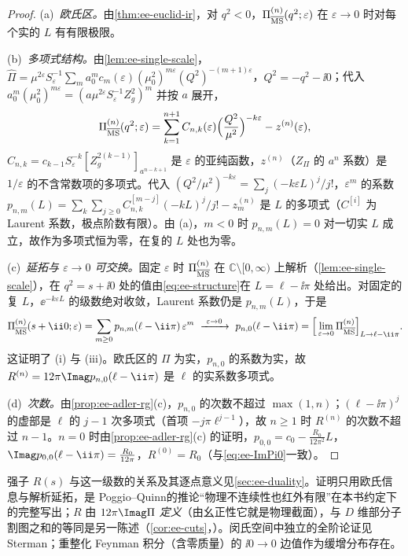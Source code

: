 \begin{proof}
(a)~\emph{欧氏区。}由\cref{thm:ee-euclid-ir}，对 $q^2<0$，$\Pi^{(n)}_{\overline{\rm MS}}(q^2;\varepsilon)$ 在 $\varepsilon\to0$ 时对每个实的 $L$ 有有限极限。

(b)~\emph{多项式结构。}由\cref{lem:ee-single-scale}，$\hat\Pi=\mu^{2\varepsilon}S_\varepsilon^{-1}\sum_ma_0^mc_m(\varepsilon)(\mu_0^2)^{m\varepsilon}(Q^2)^{-(m+1)\varepsilon}$，$Q^2=-q^2-\ii0$；代入 $a_0^m(\mu_0^2)^{m\varepsilon}=(a\mu^{2\varepsilon}S_\varepsilon^{-1}Z_g^2)^m$ 并按 $a$ 展开，
\begin{equation}\label{eq:ee-structure}
\Pi^{(n)}_{\overline{\rm MS}}(q^2;\varepsilon)=\sum_{k=1}^{n+1}C_{n,k}(\varepsilon)\Big(\frac{Q^2}{\mu^2}\Big)^{-k\varepsilon}-z^{(n)}(\varepsilon),
\end{equation}
$C_{n,k}=c_{k-1}S_\varepsilon^{-k}[Z_g^{2(k-1)}]_{a^{n-k+1}}$ 是 $\varepsilon$ 的亚纯函数，$z^{(n)}$（$Z_\Pi$ 的 $a^n$ 系数）是 $1/\varepsilon$ 的不含常数项的多项式。代入 $(Q^2/\mu^2)^{-k\varepsilon}=\sum_j(-k\varepsilon L)^j/j!$，$\varepsilon^m$ 的系数
$p_{n,m}(L)=\sum_k\sum_{j\ge0}C_{n,k}^{[m-j]}(-kL)^j/j!-z^{(n)}_m$
是 $L$ 的多项式（$C^{[i]}$ 为 Laurent 系数，极点阶数有限）。由 (a)，$m<0$ 时 $p_{n,m}(L)=0$ 对一切实 $L$ 成立，故作为多项式恒为零，在复的 $L$ 处也为零。

(c)~\emph{延拓与 $\varepsilon\to0$ 可交换。}固定 $\varepsilon$ 时 $\Pi^{(n)}_{\overline{\rm MS}}$ 在 $\mathbb C\setminus[0,\infty)$ 上解析（\cref{lem:ee-single-scale}），在 $q^2=s+\ii0$ 处的值由\cref{eq:ee-structure}在 $L=\ell-\ii\pi$ 处给出。对固定的复 $L$，$\ee^{-k\varepsilon L}$ 的级数绝对收敛，Laurent 系数仍是 $p_{n,m}(L)$，于是
\[
\Pi^{(n)}_{\overline{\rm MS}}(s+\ii0;\varepsilon)=\sum_{m\ge0}p_{n,m}(\ell-\ii\pi)\,\varepsilon^m\ \xrightarrow{\ \varepsilon\to0\ }\ p_{n,0}(\ell-\ii\pi)=\Big[\lim_{\varepsilon\to0}\Pi^{(n)}_{\overline{\rm MS}}\Big]_{L\to\ell-\ii\pi}.
\]
这证明了 (i) 与 (iii)。欧氏区的 $\Pi$ 为实，$p_{n,0}$ 的系数为实，故 $R^{(n)}=12\pi\Imag p_{n,0}(\ell-\ii\pi)$ 是 $\ell$ 的实系数多项式。

(d)~\emph{次数。}由\cref{prop:ee-adler-rg}(c)，$p_{n,0}$ 的次数不超过 $\max(1,n)$；$(\ell-\ii\pi)^j$ 的虚部是 $\ell$ 的 $j-1$ 次多项式（首项 $-j\pi\ell^{j-1}$），故 $n\ge1$ 时 $R^{(n)}$ 的次数不超过 $n-1$。$n=0$ 时由\cref{prop:ee-adler-rg}(c) 的证明，$p_{0,0}=c_0-\frac{R_0}{12\pi^2}L$，$\Imag p_{0,0}(\ell-\ii\pi)=\frac{R_0}{12\pi}$，$R^{(0)}=R_0$（与\cref{eq:ee-ImPi0}一致）。
\end{proof}
强子 $R(s)$ 与这一级数的关系及其逐点意义见\cref{sec:ee-duality}。证明只用欧氏信息与解析延拓，是 Poggio--Quinn\cite{PoggioQuinn1976}的推论“物理不连续性也红外有限”在本书约定下的完整写出；$R$ 由 $12\pi\Imag\Pi$ \emph{定义}（由幺正性它就是物理截面），与 $D$ 维部分子割图之和的等同是另一陈述（\cref{cor:ee-cuts}，\tagA）。闵氏空间中独立的全阶论证见 Sterman\cite{Sterman:1976jh,Sterman1978a,Sterman1978b}；重整化 Feynman 积分（含零质量）的 $\ii0\to0$ 边值作为缓增分布存在\cite{LowensteinSpeer1976}。

